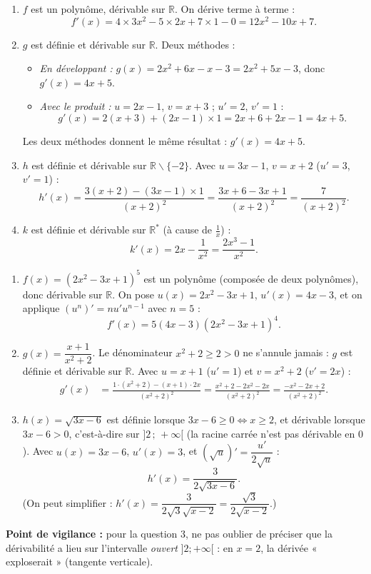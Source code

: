 \documentclass[11pt]{article}
\def\setminus{\mathbin{\backslash}}\let\smallsetminus\setminus
\begin{document}
\begin{corrige}
\begin{enumerate}
\item $f$ est un polynôme, dérivable sur $\mathbb{R}$. On dérive terme à terme :
\[ f'(x) = 4\times 3x^2 - 5\times 2x + 7\times 1 - 0 = 12x^2 - 10x + 7. \]
\item $g$ est définie et dérivable sur $\mathbb{R}$. Deux méthodes :
\begin{itemize}
\item \emph{En développant :} $g(x)=2x^2+6x-x-3=2x^2+5x-3$, donc $g'(x)=4x+5$.
\item \emph{Avec le produit :} $u=2x-1$, $v=x+3$ ; $u'=2$, $v'=1$ :
\[ g'(x)=2(x+3)+(2x-1)\times 1 = 2x+6+2x-1 = 4x+5. \]
\end{itemize}
Les deux méthodes donnent le même résultat : $g'(x)=4x+5$.
\item $h$ est définie et dérivable sur $\mathbb{R}\setminus\{-2\}$. Avec $u=3x-1$, $v=x+2$ ($u'=3$, $v'=1$) :
\[ h'(x) = \frac{3(x+2)-(3x-1)\times 1}{(x+2)^2} = \frac{3x+6-3x+1}{(x+2)^2} = \frac{7}{(x+2)^2}. \]
\item $k$ est définie et dérivable sur $\mathbb{R}^*$ (à cause de $\frac{1}{x}$) :
\[ k'(x) = 2x - \frac{1}{x^2} = \frac{2x^3-1}{x^2}. \]
\end{enumerate}
\end{corrige}

\begin{corrige}
\begin{enumerate}
\item $f(x)=(2x^2-3x+1)^5$ est un polynôme (composée de deux polynômes), donc dérivable sur $\mathbb{R}$.
On pose $u(x)=2x^2-3x+1$, $u'(x)=4x-3$, et on applique $(u^n)'=nu'u^{n-1}$ avec $n=5$ :
\[ f'(x) = 5(4x-3)(2x^2-3x+1)^4. \]
\item $g(x)=\dfrac{x+1}{x^2+2}$. Le dénominateur $x^2+2\geq 2>0$ ne s'annule jamais : $g$ est définie et dérivable sur $\mathbb{R}$.
Avec $u=x+1$ ($u'=1$) et $v=x^2+2$ ($v'=2x$) :
\begin{align*}
g'(x) &= \frac{1\cdot(x^2+2)-(x+1)\cdot 2x}{(x^2+2)^2} = \frac{x^2+2-2x^2-2x}{(x^2+2)^2} = \frac{-x^2-2x+2}{(x^2+2)^2}.
\end{align*}
\item $h(x)=\sqrt{3x-6}$ est définie lorsque $3x-6\geq 0 \iff x\geq 2$, et dérivable lorsque $3x-6>0$, c'est-à-dire sur $]2\,;\,+\infty[$ (la racine carrée n'est pas dérivable en $0$).
Avec $u(x)=3x-6$, $u'(x)=3$, et $(\sqrt{u})'=\dfrac{u'}{2\sqrt{u}}$ :
\[ h'(x) = \frac{3}{2\sqrt{3x-6}}. \]
(On peut simplifier : $h'(x)=\dfrac{3}{2\sqrt{3}\sqrt{x-2}}=\dfrac{\sqrt{3}}{2\sqrt{x-2}}$.)
\end{enumerate}
\textbf{Point de vigilance :} pour la question 3, ne pas oublier de préciser que la dérivabilité a lieu sur l'intervalle \emph{ouvert} $]2;+\infty[$ : en $x=2$, la dérivée « exploserait » (tangente verticale).
\end{corrige}
\end{document}
